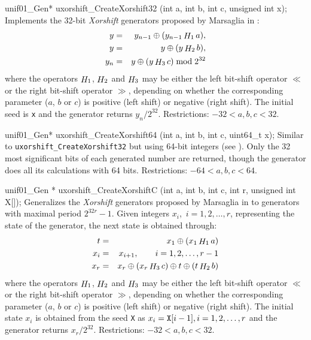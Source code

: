 unif01_Gen* uxorshift_CreateXorshift32 (int a, int b, int c, unsigned int x);
\endcode
 \tab Implements the 32-bit {\it Xorshift} generators
   proposed by Marsaglia in \cite[page 3]{rMAR03a}: \label{marsa-xorshift}
  \begin {eqnarray*}
   y &=& y_{n-1} \oplus (y_{n-1} \mathop {H}\nolimits_1 a), \\
   y &=& y \oplus (y \mathop {H}\nolimits_2 b), \\
   y_{n} &=& y \oplus (y \mathop {H}\nolimits_3 c) \bmod 2^{32}
  \end {eqnarray*}
%
   where the operators $\mathop {H}\nolimits_1$, $\mathop {H}\nolimits_2$ and $\mathop {H}\nolimits_3$ may be either
   the left bit-shift  operator $\ll$ or the right bit-shift operator $\gg$,
   depending on whether the corresponding parameter ($a$, $b$ or $c$)
   is positive (left shift) or  negative (right shift).
   The initial seed is {\tt x} and the generator returns $y_{n}/2^{32}$.
   Restrictions: $-32 < a, b, c < 32$.
  \endtab
\code


unif01_Gen* uxorshift_CreateXorshift64 (int a, int b, int c, uint64_t x);
\endcode
 \tab  Similar to {\tt uxorshift\_CreateXorshift32} but using 64-bit integers
 (see \cite[page 3]{rMAR03a}).
  Only the 32 most significant bits of each
  generated number are returned, though the generator does
  all its calculations with 64 bits.   Restrictions: $-64 < a, b, c < 64$.
  \endtab
\code


unif01_Gen * uxorshift_CreateXorshiftC (int a, int b, int c, int r,
                                        unsigned int X[]);
\endcode
 \tab Generalizes the {\it Xorshift} generators
  proposed by Marsaglia in \cite[page 4]{rMAR03a} to generators
  with maximal period  $2^{32r} - 1$.
  Given integers $x_i$,\  $i = 1,2,\ldots, r$,
   representing the state of the generator, the next
  state is obtained through:
  \begin {eqnarray*}
    t  &= & x_1 \oplus (x_1 \mathop {H}\nolimits_1 a) \\
    x_i &=& x_{i+1}, \qquad i = 1,2,\ldots, r-1 \\
    x_r   &=& x_r \oplus (x_r \mathop {H}\nolimits_3 c) \oplus t \oplus (t \mathop {H}\nolimits_2 b)
  \end {eqnarray*}
   where the operators $\mathop {H}\nolimits_1$, $\mathop {H}\nolimits_2$ and $\mathop {H}\nolimits_3$ may be either
   the left bit-shift  operator $\ll$ or the right bit-shift operator $\gg$,
   depending on whether the corresponding parameter ($a$, $b$ or $c$)
   is positive (left shift) or  negative (right shift).
   The initial state $x_i$ is obtained from the seed {\tt X} as
    $x_i = {\tt X} [i - 1],   i = 1,2,\ldots, r$ and
   the generator returns $x_{r}/2^{32}$.
   Restrictions: $-32 < a, b, c < 32$.
  \endtab
\code


